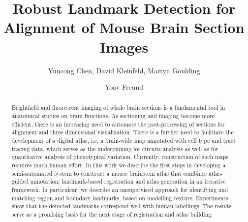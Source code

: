\documentclass{llncs}
\begin{document}

%
%
\title{Robust Landmark Detection for Alignment of Mouse Brain Section Images}
%
%
\author{Yuncong Chen, David Kleinfeld, Martyn Goulding \and Yoav Freund}
%
%
%

\maketitle              %
\begin{abstract}

Brightfield and fluorescent imaging of whole brain sections is a fundamental tool in anatomical studies on brain functions. As sectioning and imaging become more efficient, there is an increasing need to automate the post-processing of sections for alignment and three dimensional visualization. There is a further need to facilitate the development of a digital atlas, i.e. a brain-wide map annotated with cell type and tract tracing data, which serves as the underpinning for circuits analysis as well as for quantitative analysis of phenotypical variation. Currently, construction of such maps requires much human effort. In this work we describe the first steps in developing a semi-automated system to construct a mouse brainstem atlas that combines atlas-guided annotation, landmark-based registration and atlas generation in an iterative framework. 
In particulcar, we describe an unsupervised approach for identifying and matching region and boundary landmarks, based on modelling texture. Experiments show that the detected landmarks correspond well with human labellings. The results serve as a promising basis for the next stage of registration and atlas building.


\end{abstract}
%
\end{document}

